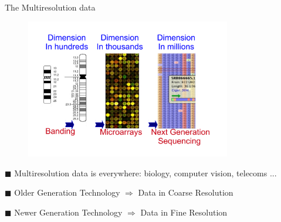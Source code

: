 \documentclass[first=dgreen,second=purple,logo=redexc]{aaltoslides}
\begin{document}

\begin{frame} {The Multiresolution data} 

\vspace{1mm}

\begin{figure}
\centering
  \includegraphics[trim=1cm 1cm 0.5cm 0.5cm, clip=true, width=0.8\textwidth]{figures/multires}
\end{figure}

\vspace{-3mm}

\footnotesize
$\blacksquare$ Multiresolution data is everywhere: biology, computer vision, telecoms ...

$\blacksquare$ Older Generation Technology $\Rightarrow$ Data in Coarse Resolution

$\blacksquare$ Newer Generation Technology $\Rightarrow$ Data in Fine Resolution

\end{frame}
% 
% 
% 
% 
% 
% 





\end{document}
